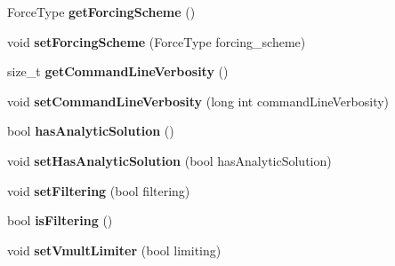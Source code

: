 \begin{DoxyCompactItemize}
\item 
\hypertarget{classnatrium_1_1SolverConfiguration_adc93e87425a89768b20379027348fa73}{
ForceType {\bfseries getForcingScheme} ()}
\label{classnatrium_1_1SolverConfiguration_adc93e87425a89768b20379027348fa73}

\item 
\hypertarget{classnatrium_1_1SolverConfiguration_acbd217e2adb33b26b16eae39e7759ce4}{
void {\bfseries setForcingScheme} (ForceType forcing\_\-scheme)}
\label{classnatrium_1_1SolverConfiguration_acbd217e2adb33b26b16eae39e7759ce4}

\item 
\hypertarget{classnatrium_1_1SolverConfiguration_ac1954ee6d225807f947222c437fcd6a4}{
size\_\-t {\bfseries getCommandLineVerbosity} ()}
\label{classnatrium_1_1SolverConfiguration_ac1954ee6d225807f947222c437fcd6a4}

\item 
\hypertarget{classnatrium_1_1SolverConfiguration_a906afb09b544bf2137c0d3bf9214b4a5}{
void {\bfseries setCommandLineVerbosity} (long int commandLineVerbosity)}
\label{classnatrium_1_1SolverConfiguration_a906afb09b544bf2137c0d3bf9214b4a5}

\item 
\hypertarget{classnatrium_1_1SolverConfiguration_a43270017646e2efa400ae84d644ac897}{
bool {\bfseries hasAnalyticSolution} ()}
\label{classnatrium_1_1SolverConfiguration_a43270017646e2efa400ae84d644ac897}

\item 
\hypertarget{classnatrium_1_1SolverConfiguration_ae23ef2513c7b4ed3eacd678e38ff146f}{
void {\bfseries setHasAnalyticSolution} (bool hasAnalyticSolution)}
\label{classnatrium_1_1SolverConfiguration_ae23ef2513c7b4ed3eacd678e38ff146f}

\item 
\hypertarget{classnatrium_1_1SolverConfiguration_ac7cc07507945d8e7903484dbf806edc7}{
void {\bfseries setFiltering} (bool filtering)}
\label{classnatrium_1_1SolverConfiguration_ac7cc07507945d8e7903484dbf806edc7}

\item 
\hypertarget{classnatrium_1_1SolverConfiguration_a558baefe69b656cf68daf0b5c2b6455c}{
bool {\bfseries isFiltering} ()}
\label{classnatrium_1_1SolverConfiguration_a558baefe69b656cf68daf0b5c2b6455c}

\item 
\hypertarget{classnatrium_1_1SolverConfiguration_a628157b455b1e1eeb7d3b663ab96759d}{
void {\bfseries setVmultLimiter} (bool limiting)}
\label{classnatrium_1_1SolverConfiguration_a628157b455b1e1eeb7d3b663ab96759d}


\end{DoxyCompactItemize}
